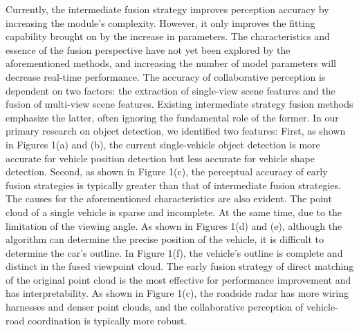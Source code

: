 \documentclass[lettersize,journal]{IEEEtran}
\begin{document}
Currently, the intermediate fusion strategy improves perception accuracy by increasing the module's complexity. However, it only improves the fitting capability brought on by the increase in parameters. The characteristics and essence of the fusion perspective have not yet been explored by the aforementioned methods, and increasing the number of model parameters will decrease real-time performance. The accuracy of collaborative perception is dependent on two factors: the extraction of single-view scene features and the fusion of multi-view scene features. Existing intermediate strategy fusion methods emphasize the latter, often ignoring the fundamental role of the former. In our primary research on object detection, we identified two features: First, as shown in Figures 1(a) and (b), the current single-vehicle object detection is more accurate for vehicle position detection but less accurate for vehicle shape detection. Second, as shown in Figure 1(c), the perceptual accuracy of early fusion strategies is typically greater than that of intermediate fusion strategies. The causes for the aforementioned characteristics are also evident. The point cloud of a single vehicle is sparse and incomplete. At the same time, due to the limitation of the viewing angle. As shown in Figures 1(d) and (e), although the algorithm can determine the precise position of the vehicle, it is difficult to determine the car's outline. In Figure 1(f), the vehicle's outline is complete and distinct in the fused viewpoint cloud. The early fusion strategy of direct matching of the original point cloud is the most effective for performance improvement and has interpretability. As shown in Figure 1(c), the roadside radar has more wiring harnesses and denser point clouds, and the collaborative perception of vehicle-road coordination is typically more robust.
\end{document}
